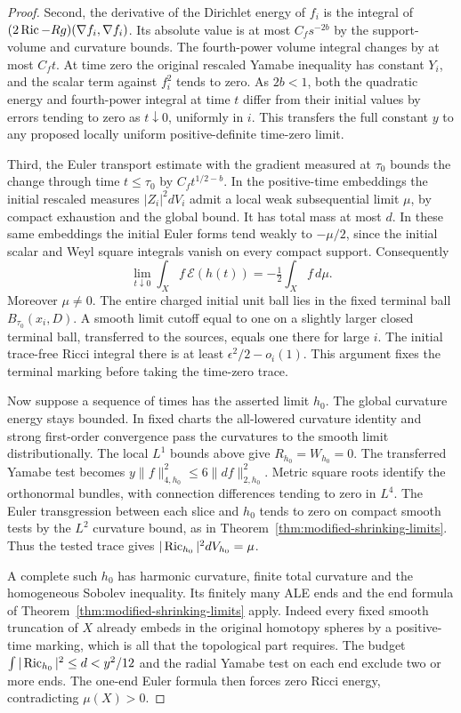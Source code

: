 \begin{proof}
Second, the derivative of the Dirichlet energy of \(f_i\) is
the integral of \((2\operatorname{Ric}-Rg)(\nabla f_i,\nabla f_i)\).
Its absolute value is at most \(C_f s^{-2b}\) by the support-volume
and curvature bounds. The fourth-power volume integral changes
by at most \(C_ft\). At time zero the original rescaled Yamabe
inequality has constant \(Y_i\), and the scalar term against
\(f_i^2\) tends to zero. As \(2b<1\), both the quadratic energy
and fourth-power integral at time \(t\) differ from their initial
values by errors tending to zero as \(t\downarrow0\), uniformly
in \(i\). This transfers the full constant \(y\) to any proposed
locally uniform positive-definite time-zero limit.

Third, the Euler transport estimate with the gradient measured at
\(\tau_0\) bounds the change through time \(t\le\tau_0\) by
\(C_f t^{1/2-b}\). In the positive-time embeddings the initial
rescaled measures \(|Z_i|^2dV_i\) admit a local weak subsequential
limit \(\mu\), by compact exhaustion and the global bound.
It has total mass at most \(d\). In these same embeddings the
initial Euler forms tend weakly to \(-\mu/2\), since the initial
scalar and Weyl square integrals vanish on every compact support.
Consequently
\[
  \lim_{t\downarrow0}\int_X f\,\mathcal E(h(t))
       =-\tfrac12\int_X f\,d\mu .
\]
Moreover \(\mu\ne0\). The entire charged initial unit ball lies
in the fixed terminal ball \(B_{\tau_0}(x_i,D)\). A smooth limit
cutoff equal to one on a slightly larger closed terminal ball,
transferred to the sources, equals one there for large \(i\).
The initial trace-free Ricci integral there is at least
\(\epsilon^2/2-o_i(1)\). This argument fixes the terminal
marking before taking the time-zero trace.

Now suppose a sequence of times has the asserted limit \(h_0\).
The global curvature energy stays bounded. In fixed charts the
all-lowered curvature identity and strong first-order convergence
pass the curvatures to the smooth limit distributionally. The
local \(L^1\) bounds above give \(R_{h_0}=W_{h_0}=0\).
The transferred Yamabe test becomes
\(y\|f\|_{4,h_0}^2\le6\|df\|_{2,h_0}^2\).
Metric square roots identify the orthonormal bundles, with
connection differences tending to zero in \(L^4\). The Euler
transgression between each slice and \(h_0\) tends to zero on
compact smooth tests by the \(L^2\) curvature bound, as in
Theorem~\ref{thm:modified-shrinking-limits}. Thus the tested
trace gives \(|\operatorname{Ric}_{h_0}|^2dV_{h_0}=\mu\).

A complete such \(h_0\) has harmonic curvature, finite total
curvature and the homogeneous Sobolev inequality. Its finitely
many ALE ends and the end formula of
Theorem~\ref{thm:modified-shrinking-limits} apply. Indeed every
fixed smooth truncation of \(X\) already embeds in the original
homotopy spheres by a positive-time marking, which is all that
the topological part requires. The budget
\(\int|\operatorname{Ric}_{h_0}|^2\le d<y^2/12\) and the radial Yamabe test on
each end exclude two or more ends. The one-end Euler formula
then forces zero Ricci energy, contradicting \(\mu(X)>0\).
\end{proof}

